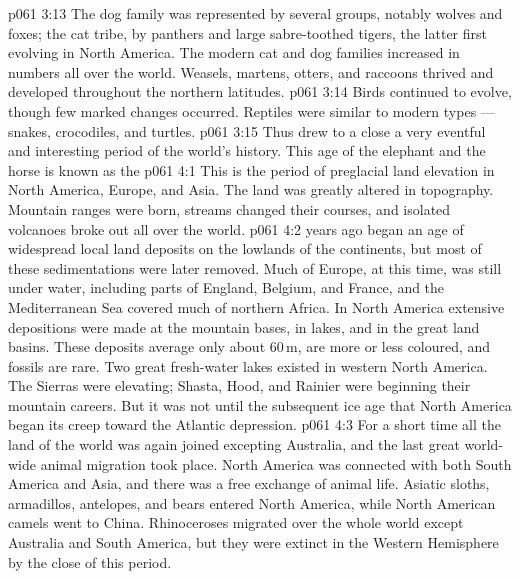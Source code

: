 \vs p061 3:13 The dog family was represented by several groups, notably wolves and foxes; the cat tribe, by panthers and large sabre\hyp{}toothed tigers, the latter first evolving in North America. The modern cat and dog families increased in numbers all over the world. Weasels, martens, otters, and raccoons thrived and developed throughout the northern latitudes.
\vs p061 3:14 Birds continued to evolve, though few marked changes occurred. Reptiles were similar to modern types --- snakes, crocodiles, and turtles.
\vs p061 3:15 \pc Thus drew to a close a very eventful and interesting period of the world’s history. This age of the elephant and the horse is known as the 
\vs p061 4:1 This is the period of preglacial land elevation in North America, Europe, and Asia. The land was greatly altered in topography. Mountain ranges were born, streams changed their courses, and isolated volcanoes broke out all over the world.
\vs p061 4:2 \pc {} years ago began an age of widespread local land deposits on the lowlands of the continents, but most of these sedimentations were later removed. Much of Europe, at this time, was still under water, including parts of England, Belgium, and France, and the Mediterranean Sea covered much of northern Africa. In North America extensive depositions were made at the mountain bases, in lakes, and in the great land basins. These deposits average only about 60\,m, are more or less coloured, and fossils are rare. Two great fresh\hyp{}water lakes existed in western North America. The Sierras were elevating; Shasta, Hood, and Rainier were beginning their mountain careers. But it was not until the subsequent ice age that North America began its creep toward the Atlantic depression.
\vs p061 4:3 For a short time all the land of the world was again joined excepting Australia, and the last great world\hyp{}wide animal migration took place. North America was connected with both South America and Asia, and there was a free exchange of animal life. Asiatic sloths, armadillos, antelopes, and bears entered North America, while North American camels went to China. Rhinoceroses migrated over the whole world except Australia and South America, but they were extinct in the Western Hemisphere by the close of this period.

